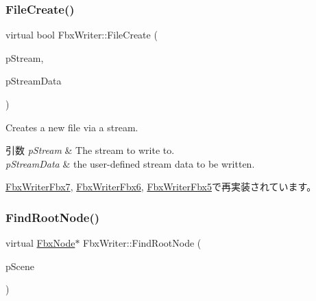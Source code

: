 \mbox{\label{class_fbx_writer_a9b64b6230b05e64a83b78b36d1667da7}} 
\subsubsection{\texorpdfstring{File\+Create()}{FileCreate()}\hspace{0.1cm}{\footnotesize\ttfamily [2/2]}}
{\footnotesize\ttfamily virtual bool Fbx\+Writer\+::\+File\+Create (\begin{DoxyParamCaption}\item[{\hyperlink{class_fbx_stream}{Fbx\+Stream} $\ast$}]{p\+Stream,  }\item[{void $\ast$}]{p\+Stream\+Data }\end{DoxyParamCaption})\hspace{0.3cm}{\ttfamily [virtual]}}

Creates a new file via a stream. 
\begin{DoxyParams}{引数}
{\em p\+Stream} & The stream to write to. \\
\hline
{\em p\+Stream\+Data} & the user-\/defined stream data to be written. \\
\hline
\end{DoxyParams}


\hyperlink{class_fbx_writer_fbx7_a0e04e17fe0912786150b2728b76871bf}{Fbx\+Writer\+Fbx7}, \hyperlink{class_fbx_writer_fbx6_a57ad09a9ed4651fee6979cf95c7d4f62}{Fbx\+Writer\+Fbx6}, \hyperlink{class_fbx_writer_fbx5_aafb683508c3203a2516d8ba74ed32501}{Fbx\+Writer\+Fbx5}で再実装されています。

\mbox{\label{class_fbx_writer_a51598448b60263516ac4da1a24deaa2a}} 
\subsubsection{\texorpdfstring{Find\+Root\+Node()}{FindRootNode()}}
{\footnotesize\ttfamily virtual \hyperlink{class_fbx_node}{Fbx\+Node}$\ast$ Fbx\+Writer\+::\+Find\+Root\+Node (\begin{DoxyParamCaption}\item[{\hyperlink{class_fbx_scene}{Fbx\+Scene} \&}]{p\+Scene }\end{DoxyParamCaption})\hspace{0.3cm}{\ttfamily [virtual]}}

